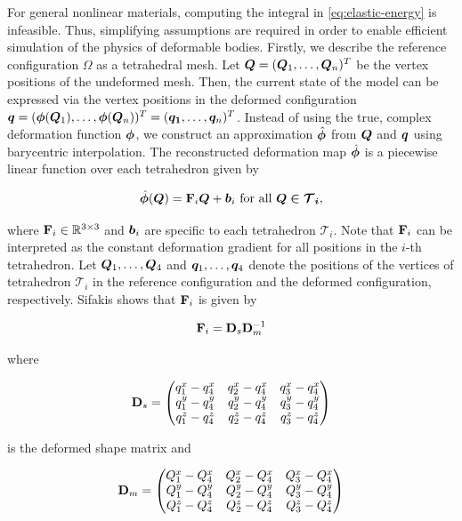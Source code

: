 For general nonlinear materials, computing the integral in \autoref{eq:elastic-energy} is infeasible. Thus, simplifying assumptions are required 
in order to enable efficient simulation of the physics of deformable bodies. Firstly, we describe the reference configuration $\Omega$ as a tetrahedral 
mesh. Let $\bm{Q} = (\bm{Q}_1, \ldots, \bm{Q}_n)^T$ be the vertex positions of the undeformed mesh. Then, the current 
state of the model can be expressed via the vertex positions in the deformed configuration $\bm{q} = (\bm{\phi}(\bm{Q}_1), \ldots, 
\bm{\phi}(\bm{Q}_n))^T = (\bm{q_1}, \ldots, \bm{q}_n)^T$. Instead of using the true, complex deformation function $\bm{\phi}$, we construct 
an approximation $\hat{\bm{\phi}}$ from $\bm{Q}$ and $\bm{q}$ using barycentric interpolation. The reconstructed deformation map $\hat{\bm{\phi}}$
is a piecewise linear function over each tetrahedron given by 

\[
    \hat{\bm{\phi}}(\bm{Q}) = \mathbf{F}_i \bm{Q} + \bm{b}_i \text{ for all } \bm{Q \in \mathcal{T}_i},
\]

\noindent where $\mathbf{F}_i \in \mathbb{R}^{3 \times 3}$ and $\bm{b}_i$ are specific to each tetrahedron $\mathcal{T}_i$. Note that $\mathbf{F}_i$ 
can be interpreted as the constant deformation gradient for all positions in the $i$-th tetrahedron. Let $\bm{Q}_1, \ldots, \bm{Q}_4$ and 
$\bm{q}_1, \ldots, \bm{q}_4$ denote the positions of the vertices of tetrahedron $\mathcal{T}_i$ in the reference configuration and the deformed 
configuration, respectively. Sifakis \cite{sifakis2012} shows that $\mathbf{F}_i$ is given by

\begin{equation}\label{eq:deformation-gradient-tet}
    \mathbf{F}_i = \mathbf{D}_s\mathbf{D}^{-1}_m
\end{equation}

\noindent where 

\[
    \mathbf{D}_s = \begin{pmatrix}
        q^x_1 - q^x_4 & q^x_2 - q^x_4 & q^x_3 - q^x_4 \\
        q^y_1 - q^y_4 & q^y_2 - q^y_4 & q^y_3 - q^y_4 \\
        q^z_1 - q^z_4 & q^z_2 - q^z_4 & q^z_3 - q^z_4
    \end{pmatrix}
\]

\noindent is the deformed shape matrix and 

\[
    \mathbf{D}_m = \begin{pmatrix}
        Q^x_1 - Q^x_4 & Q^x_2 - Q^x_4 & Q^x_3 - Q^x_4 \\
        Q^y_1 - Q^y_4 & Q^y_2 - Q^y_4 & Q^y_3 - Q^y_4 \\
        Q^z_1 - Q^z_4 & Q^z_2 - Q^z_4 & Q^z_3 - Q^z_4
    \end{pmatrix}
\]

